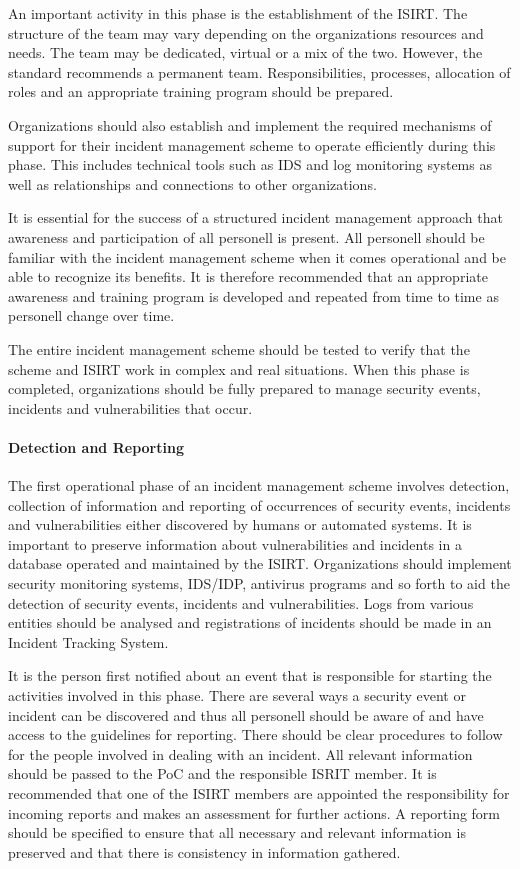 An important activity in this phase is the establishment of the ISIRT. The structure of the team may vary depending on the organizations resources and needs. The team may be dedicated, virtual or a mix of the two. However, the standard recommends a permanent team. Responsibilities, processes, allocation of roles and an appropriate training program should be prepared.

Organizations should also establish and implement the required mechanisms of support for their incident management scheme to operate efficiently during this phase. This includes technical tools such as IDS and log monitoring systems as well as relationships and connections to other organizations. 

It is essential for the success of a structured incident management approach that awareness and participation of all personell is present. All personell should be familiar with the incident management scheme when it comes operational and be able to recognize its benefits. It is therefore recommended that an appropriate awareness and training program is developed and repeated from time to time as personell change over time.

The entire incident management scheme should be tested to verify that the scheme and ISIRT work in complex and real situations. When this phase is completed, organizations should be fully prepared to manage security events, incidents and vulnerabilities that occur.

\paragraph{Detection and Reporting} The first operational phase of an incident management scheme involves detection, collection of information and reporting of occurrences of security events, incidents and vulnerabilities either discovered by humans or automated systems. It is important to preserve information about vulnerabilities and incidents in a database operated and maintained by the ISIRT. Organizations should implement security monitoring systems, IDS/IDP, antivirus programs and so forth to aid the detection of security events, incidents and vulnerabilities. Logs from various entities should be analysed and registrations of incidents should be made in an Incident Tracking System. 

It is the person first notified about an event that is responsible for starting the activities involved in this phase. There are several ways a security event or incident can be discovered and thus all personell should be aware of and have access to the guidelines for reporting. There should be clear procedures to follow for the people involved in dealing with an incident. All relevant information should be passed to the PoC and the responsible ISRIT member. It is recommended that one of the ISIRT members are appointed the responsibility for incoming reports and makes an assessment for further actions.  A reporting form should be specified to ensure that all necessary and relevant information is preserved and that there is consistency in information gathered. 

